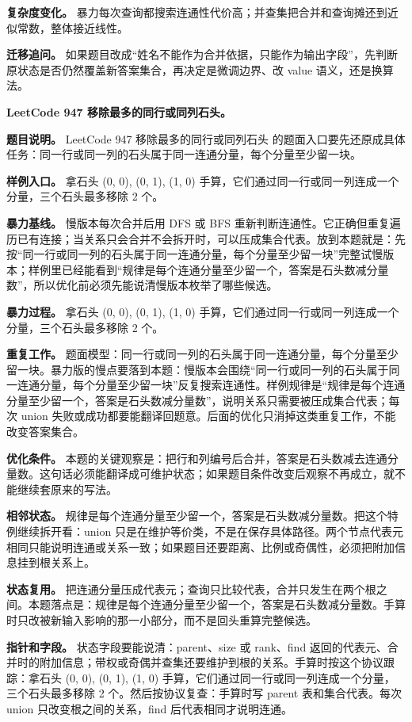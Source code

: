 \textbf{复杂度变化。} 暴力每次查询都搜索连通性代价高；并查集把合并和查询摊还到近似常数，整体接近线性。

\textbf{迁移追问。} 如果题目改成“姓名不能作为合并依据，只能作为输出字段”，先判断原状态是否仍然覆盖新答案集合，再决定是微调边界、改 value 语义，还是换算法。

\noindent\textbf{LeetCode 947 移除最多的同行或同列石头。}

\textbf{题目说明。} LeetCode 947 移除最多的同行或同列石头 的题面入口要先还原成具体任务：同一行或同一列的石头属于同一连通分量，每个分量至少留一块。

\textbf{样例入口。} 拿石头 (0, 0), (0, 1), (1, 0) 手算，它们通过同一行或同一列连成一个分量，三个石头最多移除 2 个。

\textbf{暴力基线。} 慢版本每次合并后用 DFS 或 BFS 重新判断连通性。它正确但重复遍历已有连接；当关系只会合并不会拆开时，可以压成集合代表。放到本题就是：先按“同一行或同一列的石头属于同一连通分量，每个分量至少留一块”完整试慢版本；样例里已经能看到“规律是每个连通分量至少留一个，答案是石头数减分量数”，所以优化前必须先能说清慢版本枚举了哪些候选。

\textbf{暴力过程。} 拿石头 (0, 0), (0, 1), (1, 0) 手算，它们通过同一行或同一列连成一个分量，三个石头最多移除 2 个。

\textbf{重复工作。} 题面模型：同一行或同一列的石头属于同一连通分量，每个分量至少留一块。暴力版的慢点要落到本题：慢版本会围绕“同一行或同一列的石头属于同一连通分量，每个分量至少留一块”反复搜索连通性。样例规律是“规律是每个连通分量至少留一个，答案是石头数减分量数”，说明关系只需要被压成集合代表；每次 union 失败或成功都要能翻译回题意。后面的优化只消掉这类重复工作，不能改变答案集合。

\textbf{优化条件。} 本题的关键观察是：把行和列编号后合并，答案是石头数减去连通分量数。这句话必须能翻译成可维护状态；如果题目条件改变后观察不再成立，就不能继续套原来的写法。

\textbf{相邻状态。} 规律是每个连通分量至少留一个，答案是石头数减分量数。把这个特例继续拆开看：union 只是在维护等价类，不是在保存具体路径。两个节点代表元相同只能说明连通或关系一致；如果题目还要距离、比例或奇偶性，必须把附加信息挂到根关系上。

\textbf{状态复用。} 把连通分量压成代表元；查询只比较代表，合并只发生在两个根之间。本题落点是：规律是每个连通分量至少留一个，答案是石头数减分量数。手算时只改被新输入影响的那一小部分，而不是回头重算完整候选。

\textbf{指针和字段。} 状态字段要能说清：parent、size 或 rank、find 返回的代表元、合并时的附加信息；带权或奇偶并查集还要维护到根的关系。手算时按这个协议跟踪：拿石头 (0, 0), (0, 1), (1, 0) 手算，它们通过同一行或同一列连成一个分量，三个石头最多移除 2 个。然后按协议复查：手算时写 parent 表和集合代表。每次 union 只改变根之间的关系，find 后代表相同才说明连通。

